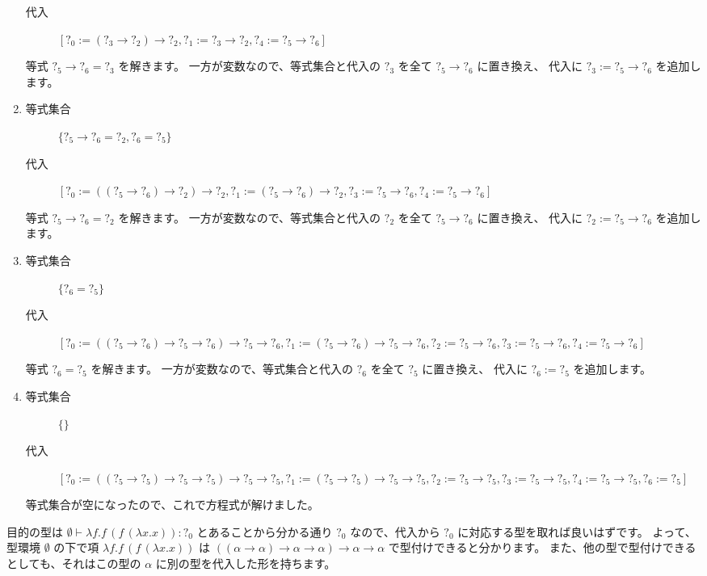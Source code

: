 \begin{enumerate}
\begin{description}
      \item[代入]
        $[?_0 := (?_3 \to ?_2) \to ?_2, ?_1 := ?_3 \to ?_2, ?_4 := ?_5 \to ?_6]$
    \end{description}
    等式 $?_5 \to ?_6 = ?_3$ を解きます。
    一方が変数なので、等式集合と代入の $?_3$ を全て $?_5 \to ?_6$ に置き換え、
    代入に $?_3 := ?_5 \to ?_6$ を追加します。
  \item
    \begin{description}
      \item[等式集合]
        $\{?_5 \to ?_6 = ?_2, ?_6 = ?_5\}$
      \item[代入]
        $[?_0 := ((?_5 \to ?_6) \to ?_2) \to ?_2, ?_1 := (?_5 \to ?_6) \to ?_2,
          ?_3 := ?_5 \to ?_6, ?_4 := ?_5 \to ?_6]$
    \end{description}
    等式 $?_5 \to ?_6 = ?_2$ を解きます。
    一方が変数なので、等式集合と代入の $?_2$ を全て $?_5 \to ?_6$ に置き換え、
    代入に $?_2 := ?_5 \to ?_6$ を追加します。
  \item
    \begin{description}
      \item[等式集合]
        $\{?_6 = ?_5\}$
      \item[代入]
        $[?_0 := ((?_5 \to ?_6) \to ?_5 \to ?_6) \to ?_5 \to ?_6,
          ?_1 := (?_5 \to ?_6) \to ?_5 \to ?_6, ?_2 := ?_5 \to ?_6, ?_3 := ?_5 \to ?_6,
          ?_4 := ?_5 \to ?_6]$
    \end{description}
    等式 $?_6 = ?_5$ を解きます。
    一方が変数なので、等式集合と代入の $?_6$ を全て $?_5$ に置き換え、
    代入に $?_6 := ?_5$ を追加します。
  \item
    \begin{description}
      \item[等式集合]
        $\{\}$
      \item[代入]
        $[?_0 := ((?_5 \to ?_5) \to ?_5 \to ?_5) \to ?_5 \to ?_5,
          ?_1 := (?_5 \to ?_5) \to ?_5 \to ?_5, ?_2 := ?_5 \to ?_5, ?_3 := ?_5 \to ?_5,
          ?_4 := ?_5 \to ?_5, ?_6 := ?_5]$
    \end{description}
    等式集合が空になったので、これで方程式が解けました。
\end{enumerate}

目的の型は $\emptyset \vdash \lambda f . f \, (f \, (\lambda x . x)) : ?_0$
とあることから分かる通り $?_0$ なので、代入から $?_0$ に対応する型を取れば良いはずです。
よって、型環境 $\emptyset$ の下で項 $\lambda f . f \, (f \, (\lambda x . x))$ は
$((\alpha \to \alpha) \to \alpha \to \alpha) \to \alpha \to \alpha$ で型付けできると分かります。
また、他の型で型付けできるとしても、それはこの型の $\alpha$ に別の型を代入した形を持ちます。

